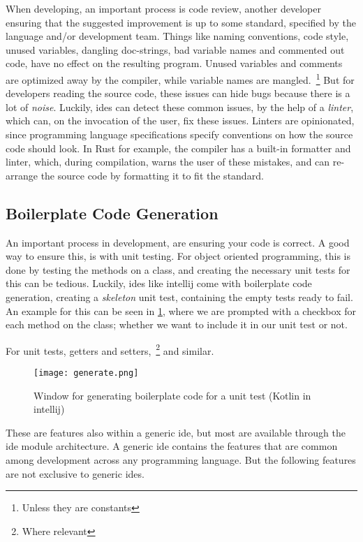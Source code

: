 When developing, an important process is code review, another developer ensuring
that the suggested improvement is up to some standard, specified by the
language and/or development team. Things like naming conventions, code style,
unused variables, dangling doc-strings, bad variable names and commented out
code, have no effect on the resulting program. Unused variables and comments
are optimized away by the compiler, while variable names are mangled.~\footnote{Unless they are constants}
But for developers reading the source code, these issues can hide bugs because
there is a lot of \textit{noise}. Luckily, \gls*{ide}s can detect these common
issues, by the help of a \textit{linter}, which can, on the invocation of the
user, fix these issues. Linters are opinionated, since programming language
specifications specify conventions on how the source code should look. In Rust
for example, the compiler has a built-in formatter and linter, which, during
compilation, warns the user of these mistakes, and can re-arrange the source
code by formatting it to fit the standard.

\subsection{Boilerplate Code Generation}

An important process in development, are ensuring your code is correct. A good
way to ensure this, is with unit testing. For object oriented programming, this
is done by testing the methods on a class, and creating the necessary unit tests
for this can be tedious. Luckily, \gls*{ide}s like \gls*{intellij} come with
boilerplate code generation, creating a \textit{skeleton} unit test, containing
the empty tests ready to fail. An example for this can be seen in
\ref{pic:generate}, where we are prompted with a checkbox for each method on
the class; whether we want to include it in our unit test or not.

For unit tests, getters and setters,~\footnote{Where relevant} and similar.

\begin{figure}
  \centering
  \texttt{[image: generate.png]}
  \caption{
    Window for generating boilerplate code for a unit test (Kotlin in
    \gls*{intellij})
  }
  \label{pic:generate}
\end{figure}

These are features also within a generic \gls*{ide}, but most are available
through the \gls*{ide} module architecture. A generic \gls*{ide} contains the
features that are common among development across any programming language. But
the following features are not exclusive to generic \gls*{ide}s.

